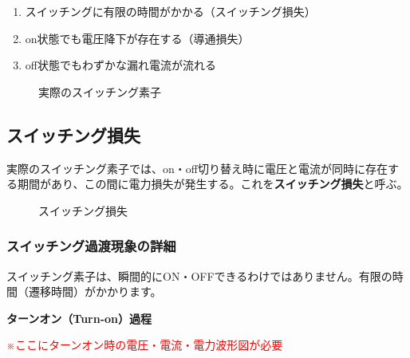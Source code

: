 \begin{enumerate}
\item スイッチングに有限の時間がかかる（スイッチング損失）
\item on状態でも電圧降下が存在する（導通損失）
\item off状態でもわずかな漏れ電流が流れる
\end{enumerate}

\begin{figure}[H]
\centering
{}
\caption{実際のスイッチング素子}
\label{fig:real_switch}
\end{figure}

\subsection{スイッチング損失}

実際のスイッチング素子では、on・off切り替え時に電圧と電流が同時に存在する期間があり、この間に電力損失が発生する。これを\textbf{スイッチング損失}と呼ぶ。

\begin{figure}[H]
\centering
{}
\caption{スイッチング損失}
\label{fig:switching_loss}
\end{figure}

\subsubsection{スイッチング過渡現象の詳細}

スイッチング素子は、瞬間的にON・OFFできるわけではありません。有限の時間（遷移時間）がかかります。

\textbf{ターンオン（Turn-on）過程}

\textcolor{red}{※ここにターンオン時の電圧・電流・電力波形図が必要}

